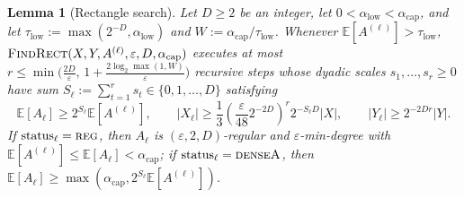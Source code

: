 \documentclass[11pt]{article}
\newtheorem{lemma}[theorem]{Lemma}
\theoremstyle{definition}
\renewcommand{\label}[1]{}%
\newcommand{\E}{\mathbb{E}}
\newcommand{\abs}[1]{\left\lvert #1 \right\rvert}
\newcommand{\dens}[1]{\E[#1]}
\newcommand{\FindRect}{\textnormal{\textsc{FindRect}}}
\newcommand{\tagreg}{\textnormal{\textsc{reg}}}
\newcommand{\tagdenseA}{\textnormal{\textsc{denseA}}}
\begin{document}
\begin{lemma}[Rectangle search]
\label{lem:find-rect}
Let $D \ge 2$ be an integer, let $0 < \alpha_{\text{low}} < \alpha_{\text{cap}}$, and let $\tau_{\text{low}} := \max(2^{-D}, \alpha_{\text{low}})$ and $W := \alpha_{\text{cap}} / \tau_{\text{low}}$. Whenever $\dens{A^{(\ell)}} > \tau_{\text{low}}$, $\FindRect(X, Y, A^{(\ell)}, \varepsilon, D, \alpha_{\text{cap}})$ executes at most $r \le \min\!\big(\frac{2D}{\varepsilon}, \, 1 + \frac{2\log_2 \max(1, W)}{\varepsilon}\big)$ recursive steps whose dyadic scales $s_1, \dots, s_r \ge 0$ have sum $S_\ell := \sum_{t=1}^r s_t \in \{0, 1, \dots, D\}$ satisfying
\begin{equation}\label{eq:capped-goodrect-shrinkage}
    \dens{A_\ell} \ge 2^{S_\ell}\dens{A^{(\ell)}}, \qquad
    \abs{X_\ell} \ge \frac{1}{3}\left(\frac{\varepsilon}{48} 2^{-2D}\right)^r 2^{-S_\ell D}\abs{X}, \qquad
    \abs{Y_\ell} \ge 2^{-2Dr}\abs{Y}.
\end{equation}
If $\text{status}_\ell = \tagreg$, then $A_\ell$ is $(\varepsilon, 2, D)$-regular and $\varepsilon$-min-degree with $\dens{A^{(\ell)}} \le \dens{A_\ell} < \alpha_{\text{cap}}$; if $\text{status}_\ell = \tagdenseA$, then $\dens{A_\ell} \ge \max(\alpha_{\text{cap}}, 2^{S_\ell}\dens{A^{(\ell)}})$.
\end{lemma}
\end{document}
